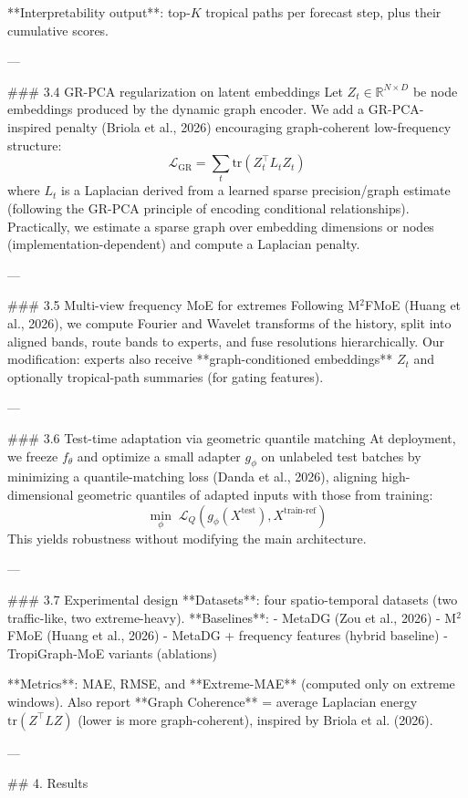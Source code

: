 **Interpretability output**: top-\(K\) tropical paths per forecast step, plus their cumulative scores.

---

### 3.4 GR-PCA regularization on latent embeddings  
Let \(Z_t \in \mathbb{R}^{N \times D}\) be node embeddings produced by the dynamic graph encoder. We add a GR-PCA-inspired penalty (Briola et al., 2026) encouraging graph-coherent low-frequency structure:
\[
\mathcal{L}_{\text{GR}} = \sum_t \mathrm{tr}(Z_t^\top L_t Z_t)
\]
where \(L_t\) is a Laplacian derived from a learned sparse precision/graph estimate (following the GR-PCA principle of encoding conditional relationships). Practically, we estimate a sparse graph over embedding dimensions or nodes (implementation-dependent) and compute a Laplacian penalty.

---

### 3.5 Multi-view frequency MoE for extremes  
Following M\(^2\)FMoE (Huang et al., 2026), we compute Fourier and Wavelet transforms of the history, split into aligned bands, route bands to experts, and fuse resolutions hierarchically. Our modification: experts also receive **graph-conditioned embeddings** \(Z_t\) and optionally tropical-path summaries (for gating features).

---

### 3.6 Test-time adaptation via geometric quantile matching  
At deployment, we freeze \(f_\theta\) and optimize a small adapter \(g_\phi\) on unlabeled test batches by minimizing a quantile-matching loss (Danda et al., 2026), aligning high-dimensional geometric quantiles of adapted inputs with those from training:
\[
\min_\phi \; \mathcal{L}_{Q}(g_\phi(X^{\text{test}}), X^{\text{train-ref}})
\]
This yields robustness without modifying the main architecture.

---

### 3.7 Experimental design  
**Datasets**: four spatio-temporal datasets (two traffic-like, two extreme-heavy).  
**Baselines**:  
- MetaDG (Zou et al., 2026)  
- M\(^2\)FMoE (Huang et al., 2026)  
- MetaDG + frequency features (hybrid baseline)  
- TropiGraph-MoE variants (ablations)

**Metrics**: MAE, RMSE, and **Extreme-MAE** (computed only on extreme windows). Also report **Graph Coherence** = average Laplacian energy \(\mathrm{tr}(Z^\top L Z)\) (lower is more graph-coherent), inspired by Briola et al. (2026).

---

## 4. Results  

